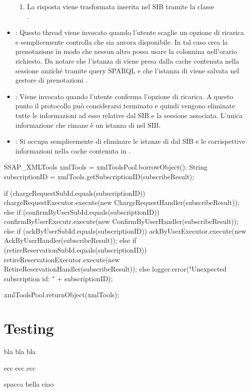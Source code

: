 \begin{itemize}
\begin{enumerate}
		\item La risposta viene trasformata inserita nel SIB tramite la classe \\ .
	\end{enumerate}
	\item {}: Questo thread viene invocato quando l'utente scaglie un opzione di ricarica e semplicemente controlla che sia ancora disponibile. In tal caso crea la prenotazione in modo che nessun altro possa usare la colonnina nell'orario richiesto. Da notare che l'istanza di  viene presa dalla cache contenuta nella sessione anziché tramite query SPARQL e che l'istanza di  viene salvata nel gestore di prenotazioni .
	\item {}: Viene invocato quando l'utente conferma l'opzione di ricarica. A questo punto il protocollo può considerarsi terminato e quindi vengono eliminate tutte le informazioni ad esso relative dal SIB e la sessione associata. L'unica informazione che rimane è un istanza di  nel SIB.
	\item {}: Si occupa semplicemente di eliminare le istanze di  dal SIB e le corrispettive informazioni nella cache contenuta in .
\end{itemize}

\begin{java}[caption={Corpo di RequestDispatcher},label={lst:requestDispatcher}]
SSAP_XMLTools xmlTools = xmlToolsPool.borrowObject();
String subscriptionID = xmlTools.getSubscriptionID(subscribeResult);

if (chargeRequestSubId.equals(subscriptionID)) {
	chargeRequestExecutor.execute(new ChargeRequestHandler(subscribeResult));
} else if (confirmByUserSubId.equals(subscriptionID)) {
	confirmByUserExecutr.execute(new ConfirmByUserHandler(subscribeResult));
} else if (ackByUserSubId.equals(subscriptionID)) {
	ackByUserExecutor.execute(new AckByUserHandler(subscribeResult));
} else if (retireReservationSubId.equals(subscriptionID)) {
	retireReservationExecutor.execute(new RetireReservationHandler(subscribeResult));
} else {
	logger.error("Unexpected subscription id: " + subscriptionID);
}

xmlToolsPool.returnObject(xmlTools);
\end{java}	


\section{Testing}

bla bla bla

ecc ecc ecc

spacca bella ciao









